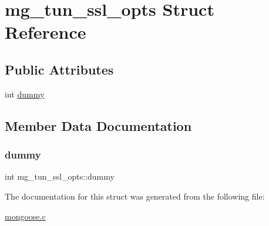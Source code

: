 \hypertarget{structmg__tun__ssl__opts}{}\section{mg\+\_\+tun\+\_\+ssl\+\_\+opts Struct Reference}
\label{structmg__tun__ssl__opts}
\subsection*{Public Attributes}
\begin{DoxyCompactItemize}
\item 
int \hyperlink{structmg__tun__ssl__opts_ae2b8a40a2d19ae76a510bf99b2cc4da8_ae2b8a40a2d19ae76a510bf99b2cc4da8}{dummy}
\end{DoxyCompactItemize}


\subsection{Member Data Documentation}
\mbox{\label{structmg__tun__ssl__opts_ae2b8a40a2d19ae76a510bf99b2cc4da8_ae2b8a40a2d19ae76a510bf99b2cc4da8}} 
\subsubsection{\texorpdfstring{dummy}{dummy}}
{\footnotesize\ttfamily int mg\+\_\+tun\+\_\+ssl\+\_\+opts\+::dummy}



The documentation for this struct was generated from the following file\+:\begin{DoxyCompactItemize}
\item 
\hyperlink{mongoose_8c}{mongoose.\+c}\end{DoxyCompactItemize}
